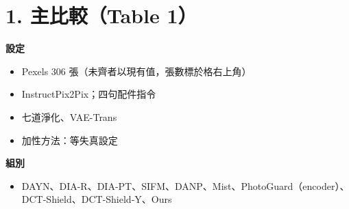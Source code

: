 \documentclass[10pt]{article}
\begin{document}
\section*{1. 主比較（Table 1）}
\textbf{設定}
\begin{itemize}
  \item Pexels 306 張（未齊者以現有值，張數標於格右上角）
  \item InstructPix2Pix；四句配件指令
  \item 七道淨化、VAE-Trans
  \item 加性方法：等失真設定
\end{itemize}
\textbf{組別}
\begin{itemize}
  \item DAYN、DIA-R、DIA-PT、SIFM、DANP、Mist、PhotoGuard（encoder）、DCT-Shield、DCT-Shield-Y、Ours
\end{itemize}
\end{document}
